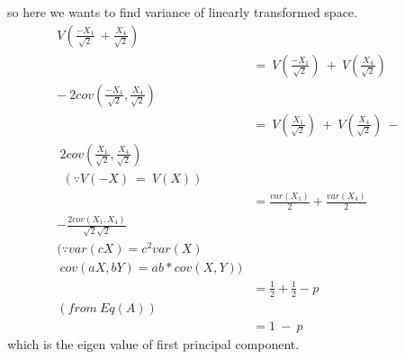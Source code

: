 \documentclass[journal,12pt,twocolumn]{IEEEtran}
\begin{document}
so here we wants to find variance of linearly transformed space.
\\
\begin{align*}
    V(\frac{-X_1}{\sqrt{2}}\:+\frac{X_4}{\sqrt{2}})\:{}&\\
    &=\:V(\frac{-X_1}{\sqrt{2}})\:+\:V(\frac{X_4}{\sqrt{2}})\:&\\-\:2cov(\frac{-X_1}{\sqrt{2}},\frac{X_4}{\sqrt{2}}) \\
    &=\:V(\frac{X_1}{\sqrt{2}})\:+\:V(\frac{X_4}{\sqrt{2}})\:-&\\\:2cov(\frac{X_1}{\sqrt{2}},\frac{X_4}{\sqrt{2}}) \\
    \:\:(\because V(-X)\:=\:V(X))\\
    &= \frac{var(X_1)}{2} + \frac{var(X_4)}{2} &\\- \frac{2cov(X_1,X_4)}{\sqrt{2}\sqrt{2}} &\\
    (\because var(cX) = c^2var(X) &\\\:cov(aX,bY) = ab*cov(X,Y))\\
    &=\frac{1}{2}+\frac{1}{2}-p&\\(from \:Eq(A))&\\
    &=1\:-\:p
\end{align*} which is the eigen value of first principal component.
\end{document}

